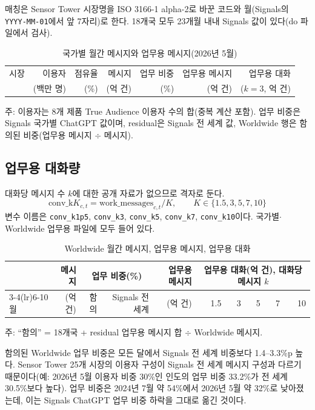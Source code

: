\documentclass[11pt]{article}
\begin{document}
매칭은 Sensor Tower 시장명을 ISO 3166-1 alpha-2로 바꾼 코드와 월(Signals의 \texttt{YYYY-MM-01}에서 앞 7자리)로 한다. 18개국 모두 23개월 내내 Signals 값이 있다(do 파일에서 검사).

\begin{table}[h]
\centering
\small
\caption{국가별 월간 메시지와 업무용 메시지(2026년 5월)}\label{tab:country}
\begin{tabular}{lrrrrrr}
\toprule
시장 & 이용자 & 점유율 & 메시지 & 업무 비중 & 업무용 메시지 & 업무용 대화 \\
 & (백만 명) & (\%) & (억 건) & (\%) & (억 건) & ($k=3$, 억 건) \\
\midrule

\bottomrule
\end{tabular}
\par\smallskip\footnotesize 주: 이용자는 8개 제품 True Audience 이용자 수의 합(중복 계산 포함). 업무 비중은 Signals 국가별 ChatGPT 값이며, residual은 Signals 전 세계 값, Worldwide 행은 함의된 비중(업무용 메시지 $\div$ 메시지).
\end{table}

\subsection{업무용 대화량}
대화당 메시지 수 $k$에 대한 공개 자료가 없으므로 격자로 둔다.
\[
  \text{conv\_k}K_{c,t} = \text{work\_messages}_{c,t} / K, \qquad K \in \{1.5, 3, 5, 7, 10\}
\]
변수 이름은 \texttt{conv\_k1p5}, \texttt{conv\_k3}, \texttt{conv\_k5}, \texttt{conv\_k7}, \texttt{conv\_k10}이다. 국가별$\cdot$Worldwide 업무용 파일에 모두 들어 있다.

\begin{table}[h]
\centering
\footnotesize
\caption{Worldwide 월간 메시지, 업무용 메시지, 업무용 대화}\label{tab:ww}
\begin{tabular}{lrrrrrrrrr}
\toprule
 & 메시지 & \multicolumn{2}{c}{업무 비중(\%)} & 업무용 메시지 & \multicolumn{5}{c}{업무용 대화(억 건), 대화당 메시지 $k$} \\
\cmidrule(lr){3-4}\cmidrule(lr){6-10}
월 & (억 건) & 함의 & Signals 전 세계 & (억 건) & 1.5 & 3 & 5 & 7 & 10 \\
\midrule

\bottomrule
\end{tabular}
\par\smallskip 주: ``함의'' = 18개국 + residual 업무용 메시지 합 $\div$ Worldwide 메시지.
\end{table}

함의된 Worldwide 업무 비중은 모든 달에서 Signals 전 세계 비중보다 1.4--3.3\%p 높다. Sensor Tower 25개 시장의 이용자 구성이 Signals 전 세계 메시지 구성과 다르기 때문이다(예: 2026년 5월 이용자 비중 30\%인 인도의 업무 비중 33.2\%가 전 세계 30.5\%보다 높다). 업무 비중은 2024년 7월 약 54\%에서 2026년 5월 약 32\%로 낮아졌는데, 이는 Signals ChatGPT 업무 비중 하락을 그대로 옮긴 것이다.
\end{document}
